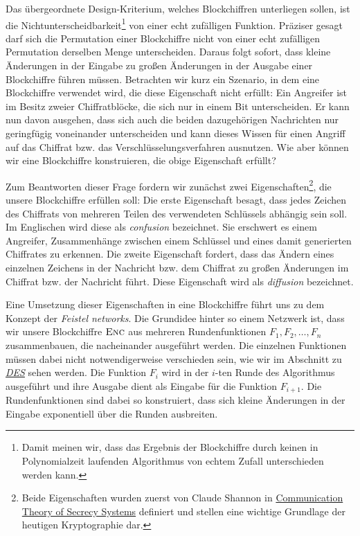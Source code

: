 Das übergeordnete Design-Kriterium, welches Blockchiffren unterliegen sollen, ist die Nichtunterscheidbarkeit\footnote{Damit meinen wir, dass das Ergebnis der Blockchiffre durch keinen in Polynomialzeit laufenden Algorithmus von echtem Zufall unterschieden werden kann.} von einer echt zufälligen Funktion. Präziser gesagt darf sich die Permutation einer Blockchiffre nicht von einer echt zufälligen Permutation derselben Menge unterscheiden. Daraus folgt sofort, dass kleine Änderungen in der Eingabe zu großen Änderungen in der Ausgabe einer Blockchiffre führen müssen. Betrachten wir kurz ein Szenario, in dem eine Blockchiffre verwendet wird, die diese Eigenschaft nicht erfüllt: Ein Angreifer ist im Besitz zweier Chiffratblöcke, die sich nur in einem Bit unterscheiden. Er kann nun davon ausgehen, dass sich auch die beiden dazugehörigen Nachrichten nur geringfügig voneinander unterscheiden und kann dieses Wissen für einen Angriff auf das Chiffrat bzw. das Verschlüsselungsverfahren ausnutzen. Wie aber können wir eine Blockchiffre konstruieren, die obige Eigenschaft erfüllt?

Zum Beantworten dieser Frage fordern wir zunächst zwei Eigenschaften\footnote{Beide Eigenschaften wurden zuerst von Claude Shannon in \href{http://netlab.cs.ucla.edu/wiki/files/shannon1949.pdf}{Communication Theory of Secrecy Systems} definiert und stellen eine wichtige Grundlage der heutigen Kryptographie dar.}, die unsere Blockchiffre erfüllen soll:
Die erste Eigenschaft besagt, dass jedes Zeichen des Chiffrats von mehreren Teilen des verwendeten Schlüssels abhängig sein soll. Im Englischen wird diese als \textit{confusion} bezeichnet. Sie erschwert es einem Angreifer, Zusammenhänge zwischen einem Schlüssel und eines damit generierten Chiffrates zu erkennen.
Die zweite Eigenschaft fordert, dass das Ändern eines einzelnen Zeichens in der Nachricht bzw. dem Chiffrat zu großen Änderungen im Chiffrat bzw. der Nachricht führt. Diese Eigenschaft wird als \textit{diffusion} bezeichnet.

Eine Umsetzung dieser Eigenschaften in eine Blockchiffre führt uns zu dem Konzept der \textit{Feistel networks}.
Die Grundidee hinter so einem Netzwerk ist, dass wir unsere Blockchiffre \(\textsc{Enc}\) aus mehreren Rundenfunktionen \(F_1, F_2,\dots, F_n\) zusammenbauen, die nacheinander ausgeführt werden. Die einzelnen Funktionen müssen dabei nicht notwendigerweise verschieden sein, wie wir im Abschnitt zu \hyperref[sssec:des]{\textit{DES}} sehen werden. Die Funktion \(F_i\) wird in der $i$-ten Runde des Algorithmus ausgeführt und ihre Ausgabe dient als Eingabe für die Funktion \(F_{i+1}\). Die Rundenfunktionen sind dabei so konstruiert, dass sich kleine Änderungen in der Eingabe exponentiell über die Runden ausbreiten.

